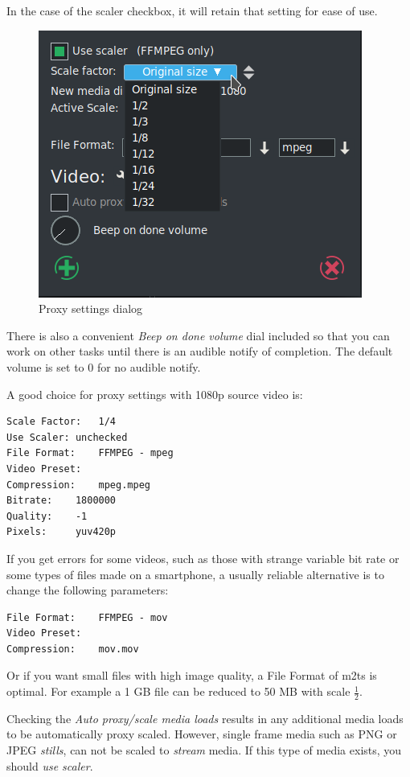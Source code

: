 In the case of the scaler checkbox, it will retain that setting for ease of use.

\begin{figure}[htpb]
	\centering
	\includegraphics[width=0.6\linewidth]{images/proxy-02.png}
	\caption{Proxy settings dialog}
	\label{fig:proxy-02}
\end{figure}

There is also a convenient \textit{Beep on done volume} dial included so that you can work on other tasks until there is an audible notify of completion.  The default volume is set to 0 for no audible notify.

A good choice for proxy settings with 1080p source video is:

\begin{lstlisting}[numbers=none]
Scale Factor: 	1/4
Use Scaler:	unchecked
File Format:	FFMPEG - mpeg
Video Preset:
Compression:	mpeg.mpeg
Bitrate:	1800000
Quality:	-1
Pixels:		yuv420p
\end{lstlisting}

If you get errors for some videos, such as those with strange variable bit rate or some types of files made on a smartphone, a usually reliable alternative is to change the following parameters:

\begin{lstlisting}[numbers=none]
File Format:	FFMPEG - mov
Video Preset:
Compression:	mov.mov
\end{lstlisting}

Or if you want small files with high image quality, a File Format of m2ts is optimal.  For example a 1 GB file can be reduced to 50 MB with scale $\frac{1}{2}$. 

Checking the \textit{Auto proxy/scale media loads} results in any additional media loads to be automatically proxy scaled.  However, single frame media such as PNG or JPEG \textit{stills}, can not be scaled to \textit{stream} media.  If this type of media exists, you should \textit{use scaler}.

